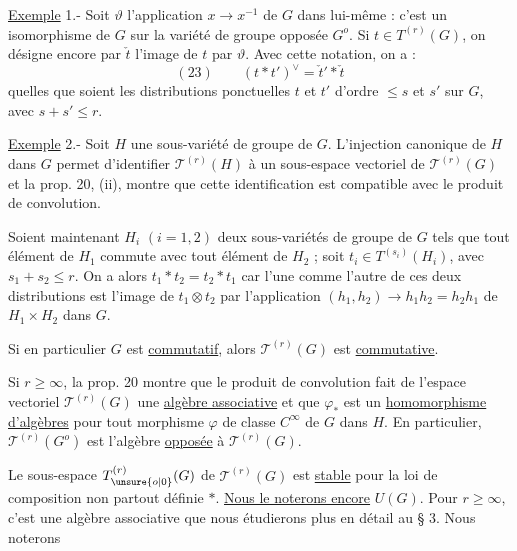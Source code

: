 
\uline{Exemple} 1.- Soit $\vartheta$ l'application $x\longrightarrow x^{-1}$ de $G$ dans lui-même : c'est un isomorphisme de $G$ sur la variété de groupe opposée $G^o$. Si $t\in T^{(r)}(G)$, on désigne encore par $\check t$ l'image de $t$ par $\vartheta$. Avec cette notation, on a :
\[
(23)\qquad (t*t')^\vee=\check t'*\check t
\]
quelles que soient les distributions ponctuelles $t$ et $t'$ d'ordre $\leq s$ et $s'$ sur $G$, avec $s+s'\leq r$.

\uline{Exemple} 2.- Soit $H$ une sous-variété de groupe de $G$. L'injection canonique de $H$ dans $G$ permet d'identifier $\mathcal T^{(r)}(H)$ à un sous-espace vectoriel de $\mathcal T^{(r)}(G)$ et la prop. 20, (ii), montre que cette identification est compatible avec le produit de convolution.

Soient maintenant $H_i$ $(i=1,2)$ deux sous-variétés de groupe de $G$ tels que tout élément de $H_1$ commute avec tout élément de $H_2$ ; soit $t_i\in T^{(s_i)}(H_i)$, avec $s_1+s_2\leq r$. On a alors $t_1*t_2=t_2*t_1$ car l'une comme l'autre de ces deux distributions est l'image de $t_1\otimes t_2$ par l'application $(h_1,h_2)\longrightarrow h_1h_2=h_2h_1$ de $H_1\times H_2$ dans $G$.

Si en particulier $G$ est \uline{commutatif}, alors $\mathcal T^{(r)}(G)$ est \uline{commutative}.

Si $r\geq\infty$, la prop. 20 montre que le produit de convolution fait de l'espace vectoriel $\mathcal T^{(r)}(G)$ une \uline{algèbre associative} et que $\varphi_*$ est un \uline{homomorphisme d'algèbres} pour tout morphisme $\varphi$ de classe $C^\infty$ de $G$ dans $H$. En particulier, $\mathcal T^{(r)}(G^o)$ est l'algèbre \uline{opposée} à $\mathcal T^{(r)}(G)$.

Le sous-espace $T_{\unsure{o|0}}^{(r)}(G)$ de $\mathcal T^{(r)}(G)$ est \uline{stable} pour la loi de composition non partout définie $*$. \uline{Nous le noterons encore} $U(G)$. Pour $r\geq\infty$, c'est une algèbre associative que nous étudierons plus en détail au § 3. Nous noterons
